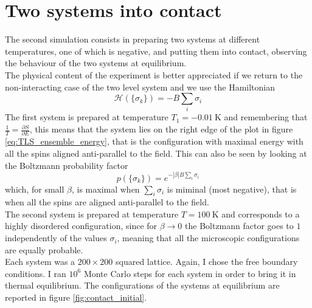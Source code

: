 \section{Two systems into contact}
The second simulation consists in preparing two systems at different temperatures, one of which is negative, and putting them into contact, observing the behaviour of the two systems at equilibrium. \\
The physical content of the experiment is better appreciated if we return to the non-interacting case of the two level system and we use the Hamiltonian
\begin{equation*}
    \mathcal{H}(\{\sigma_k\}) = -B \sum_i \sigma_i
\end{equation*}
The first system is prepared at temperature $T_1 = \SI{-0.01}{\kelvin}$ and remembering that $\frac{1}{T} = \frac{\partial S}{\partial E}$, this means that the system lies on the right edge of the plot in figure \ref{eq:TLS_ensemble_energy}, that is the configuration with maximal energy with all the spins aligned anti-parallel to the field. This can 
also be seen by looking at the Boltzmann probability factor 
\begin{equation*}
    p(\{\sigma_k\}) = e^{-|\beta| B \sum_i \sigma_i}
\end{equation*}
which, for small $\beta$, is maximal when $\sum_i \sigma_i$ is miminal (most negative), that is when all the spins are aligned anti-parallel to the field. \\
The second system is prepared at temperature $T=\SI{100}{\kelvin}$ and corresponds to a highly disordered configuration, since for $\beta \to 0$ the Boltzmann factor goes to $1$ independently of the values $\sigma_i$, meaning that all the microscopic configurations are equally probable. \\
Each system was a $200 \times 200$ squared lattice. Again, I chose the free boundary conditions. I ran $10^6$ Monte Carlo steps for each system in order to bring it in thermal equilibrium. The configurations of the systems at equilibrium are reported in figure \ref{fig:contact_initial}. \par
